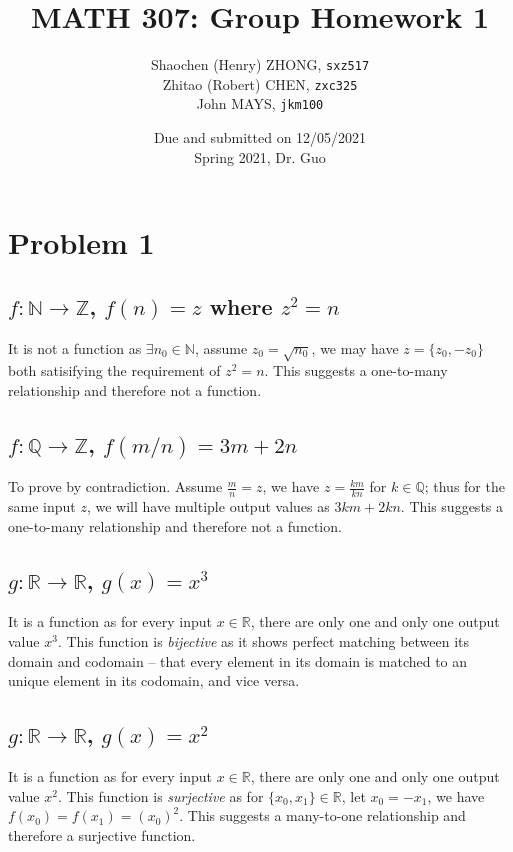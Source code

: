 \documentclass[11pt]{article}
\newcommand{\ilc}{\texttt}
\begin{document}
\title{\textbf{MATH 307: Group Homework 1}}


\author{Shaochen (Henry) ZHONG, \ilc{sxz517} \\
Zhitao (Robert) CHEN, \ilc{zxc325} \\
John MAYS, \ilc{jkm100}}
\date{Due and submitted on 12/05/2021 \\ Spring 2021, Dr. Guo}
\maketitle



\section*{Problem 1}

\subsection*{$f: \mathbb{N} \to \mathbb{Z}$, $f(n) = z$ where $z^2 = n$}

It is not a function as $\exists  n_0 \in \mathbb{N}$, assume $z_0 = \sqrt{n_0}$, we may have $z = \{z_0, -z_0\}$ both satisifying the requirement of $z^2 = n$. This suggests a one-to-many relationship and therefore not a function.


\subsection*{$f: \mathbb{Q} \to \mathbb{Z}$, $f(m/n) = 3m + 2n$}

To prove by contradiction. Assume $\frac{m}{n} = z$, we have $z = \frac{km}{kn}$ for $k \in \mathbb{Q}$; thus for the same input $z$, we will have multiple output values as $3km + 2kn$. This suggests a one-to-many relationship and therefore not a function.

\subsection*{$g: \mathbb{R} \to \mathbb{R}$, $g(x) = x^3$}

It is a function as for every input $x \in \mathbb{R}$, there are only one and only one output value $x^3$. This function is  \textit{bijective} as it shows perfect matching between its domain and codomain -- that every element in its domain is matched to an unique element in its codomain, and vice versa.

\subsection*{$g: \mathbb{R} \to \mathbb{R}$, $g(x) = x^2$}

It is a function as for every input $x \in \mathbb{R}$, there are only one and only one output value $x^2$. This function is \textit{surjective} as for $\{x_0, x_1\} \in \mathbb{R}$, let $x_0 = -x_1$, we have $f(x_0) = f(x_1) = (x_0)^2$. This suggests a many-to-one relationship and therefore a surjective function.
\end{document}
